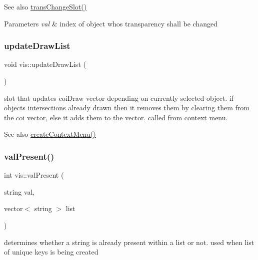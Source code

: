 \begin{DoxySeeAlso}{See also}
\mbox{\hyperlink{classvis_af2c43f4aaebe6ee5047e8eb9e9e8eedd}{trans\+Change\+Slot()}} 
\end{DoxySeeAlso}

\begin{DoxyParams}{Parameters}
{\em val} & index of object whos transparency shall be changed \\
\hline
\end{DoxyParams}
\mbox{\label{classvis_afd17774826a24e88c4f2eae14d85c7b4}} 
\subsubsection{\texorpdfstring{update\+Draw\+List}{updateDrawList}}
{\footnotesize\ttfamily void vis\+::update\+Draw\+List (\begin{DoxyParamCaption}{ }\end{DoxyParamCaption})\hspace{0.3cm}{\ttfamily [slot]}}

slot that updates coi\+Draw vector depending on currently selected object. if object\textquotesingle{}s intersections already drawn then it removes them by clearing them from the coi vector, else it adds them to the vector. called from context menu.

\begin{DoxySeeAlso}{See also}
\mbox{\hyperlink{classvis_a63af66f730f0f06f36d255bcc7a7a244}{create\+Context\+Menu()}} 
\end{DoxySeeAlso}
\mbox{\label{classvis_a89dba18d9f27f573ea2f30bfe4b3dc03}} 
\subsubsection{\texorpdfstring{val\+Present()}{valPresent()}}
{\footnotesize\ttfamily int vis\+::val\+Present (\begin{DoxyParamCaption}\item[{string}]{val,  }\item[{vector$<$ string $>$}]{list }\end{DoxyParamCaption})}

determines whether a string is already present within a list or not. used when list of unique keys is being created

